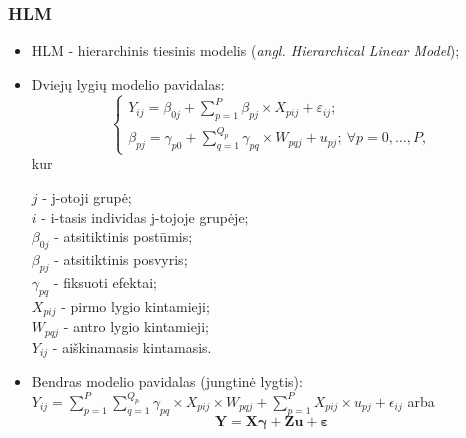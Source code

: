 \documentclass[utf8,hyperref={unicode,pdftex}]{beamer}
\begin{document}
\begin{frame}
\frametitle{HLM}
\begin{itemize}
\item HLM - hierarchinis tiesinis modelis (\textit{angl. Hierarchical Linear Model});
\item Dviejų lygių modelio pavidalas: 
\[ \left\{
  \begin{array}{l}
    Y_{ij} = \beta_{0j}+\sum^P_{p = 1} \beta_{pj}\times X_{pij}+\varepsilon_{ij}; \\
    \beta_{pj} = \gamma_{p0} + \sum^{Q_p}_{q=1}\gamma_{pq}\times W_{pqj}+u_{pj};\ \forall p = 0 , \dots, P,
  \end{array} \right.\]
kur\\
\begin{scriptsize}
$j$ - j-otoji grupė;\\
$i$ - i-tasis individas j-tojoje grupėje;\\
$\beta_{0j}$ - atsitiktinis postūmis;\\
$\beta_{pj}$ - atsitiktinis posvyris;\\
$\gamma_{pq}$ - fiksuoti efektai;\\
$X_{pij}$ - pirmo lygio kintamieji;\\
$W_{pqj}$ - antro lygio kintamieji;\\
$Y_{ij}$ - aiškinamasis kintamasis.
\end{scriptsize}
\small
\item Bendras modelio pavidalas (jungtinė lygtis): $ Y_{ij} =\sum^P_{p = 1} \sum^{Q_p}_{q=1}\gamma_{pq}\times X_{pij}\times W_{pqj}+\sum^P_{p = 1} X_{pij}\times u_{pj}+\epsilon_{ij}$ arba
\begin{equation}
\mathbf{Y}=\mathbf{X}\boldsymbol{\gamma}+\mathbf{Z}\mathbf{u}+\boldsymbol{\varepsilon}
\end{equation}
\end{itemize}
\end{frame}
\end{document}
